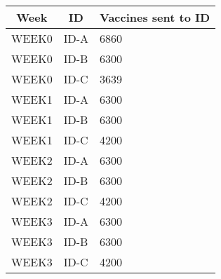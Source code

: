 \documentclass[12pt]{article}
\begin{document}
{    \begin{center}
        \begin{table}[H]
            \begin{tabular}{|l|l|l|}
            \hline
            \multicolumn{1}{|c|}{\textbf{Week}} & \multicolumn{1}{c|}{\textbf{ID}} & \multicolumn{1}{c|}{\textbf{Vaccines sent to   ID}} \\ \hline
            WEEK0                               & ID-A                             & 6860                                                \\ \hline
            WEEK0                               & ID-B                             & 6300                                                \\ \hline
            WEEK0                               & ID-C                             & 3639                                                \\ \hline
            WEEK1                               & ID-A                             & 6300                                                \\ \hline
            WEEK1                               & ID-B                             & 6300                                                \\ \hline
            WEEK1                               & ID-C                             & 4200                                                \\ \hline
            WEEK2                               & ID-A                             & 6300                                                \\ \hline
            WEEK2                               & ID-B                             & 6300                                                \\ \hline
            WEEK2                               & ID-C                             & 4200                                                \\ \hline
            WEEK3                               & ID-A                             & 6300                                                \\ \hline
            WEEK3                               & ID-B                             & 6300                                                \\ \hline
            WEEK3                               & ID-C                             & 4200                                                \\ \hline

\end{tabular}
\end{table}
\end{center}}
\end{document}

